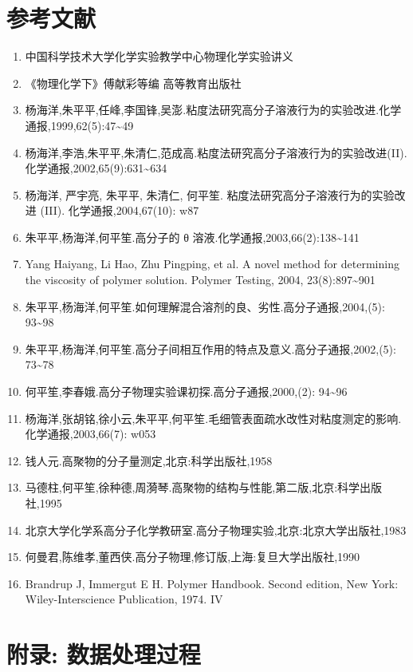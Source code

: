 \documentclass[11pt]{report}
\begin{document}
\part{参考文献}
\label{sec:org86ab395}
\begin{enumerate}
\item 中国科学技术大学化学实验教学中心物理化学实验讲义
\item 《物理化学下》傅献彩等编 高等教育出版社
\item 杨海洋,朱平平,任峰,李国锋,吴澎.粘度法研究高分子溶液行为的实验改进.化学通报,1999,62(5):47\textasciitilde{}49
\item 杨海洋,李浩,朱平平,朱清仁,范成高.粘度法研究高分子溶液行为的实验改进(II).化学通报,2002,65(9):631\textasciitilde{}634
\item 杨海洋, 严宇亮, 朱平平, 朱清仁, 何平笙. 粘度法研究高分子溶液行为的实验改进 (III). 化学通报,2004,67(10): w87
\item 朱平平,杨海洋,何平笙.高分子的 θ 溶液.化学通报,2003,66(2):138\textasciitilde{}141
\item Yang Haiyang, Li Hao, Zhu Pingping, et al. A novel method for determining the viscosity of polymer solution. Polymer Testing, 2004, 23(8):897\textasciitilde{}901
\item 朱平平,杨海洋,何平笙.如何理解混合溶剂的良、劣性.高分子通报,2004,(5): 93\textasciitilde{}98
\item 朱平平,杨海洋,何平笙.高分子间相互作用的特点及意义.高分子通报,2002,(5): 73\textasciitilde{}78
\item 何平笙,李春娥.高分子物理实验课初探.高分子通报,2000,(2): 94\textasciitilde{}96
\item 杨海洋,张胡铭,徐小云,朱平平,何平笙.毛细管表面疏水改性对粘度测定的影响.化学通报,2003,66(7): w053
\item 钱人元.高聚物的分子量测定,北京:科学出版社,1958
\item 马德柱,何平笙,徐种德,周漪琴.高聚物的结构与性能,第二版,北京:科学出版社,1995
\item 北京大学化学系高分子化学教研室.高分子物理实验,北京:北京大学出版社,1983
\item 何曼君,陈维孝,董西侠.高分子物理,修订版,上海:复旦大学出版社,1990
\item Brandrup J, Immergut E H. Polymer Handbook. Second edition, New York: Wiley-Interscience Publication, 1974. IV
\end{enumerate}


\part{附录: 数据处理过程}
\label{sec:org9ce5d25}
\end{document}
